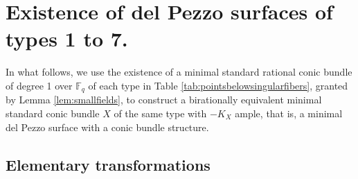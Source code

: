 \documentclass[a4paper, 11pt, reqno]{amsart}
\numberwithin{equation}{section} \numberwithin{figure}{section}
\def \F {{\mathbb F}}
\theoremstyle{definition}
\numberwithin{lemma}{section}
\begin{document}

\section{Existence of del Pezzo surfaces of types 1 to 7.}\label{sec:method1}

In what follows, we use the existence of a minimal standard rational conic bundle of degree 1 over $\F_q$ of each type in Table \ref{tab:pointsbelowsingularfibers}, granted by Lemma \ref{lem:smallfields}, to construct a birationally equivalent minimal standard conic bundle $X$ of the same type with $-K_X$ ample, that is, a minimal del Pezzo surface with a conic bundle structure.

\subsection{Elementary transformations}\label{sec:elementarytransformations}
\end{document}
